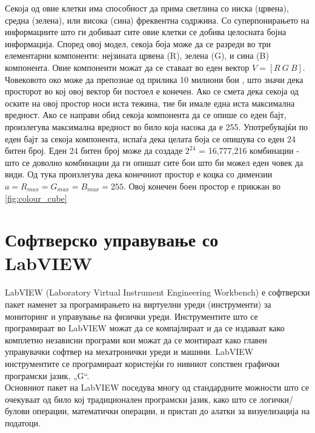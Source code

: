 \documentclass[11pt]{article}
\begin{document}
    Секоја од овие клетки има способност да прима светлина со ниска (црвена), средна (зелена), или висока (сина) фреквентна содржина. Со суперпонирањето на информациите што ги добиваат сите овие клетки се добива целосната бојна информација. Според овој модел, секоја боја може да се разреди во три елементарни компоненти: нејзината црвена (R), зелена (G), и сина (B) компонента. Овие компоненти можат да се ставаат во еден вектор $ V = [R\ G\ B]$. Човековото око може да препознае од прилика 10 милиони бои \cite{nColours}, што значи дека просторот во кој овој вектор би постоел е конечен. Ако се смета дека секоја од оските на овој простор носи иста тежина, тие би имале една иста максимална вредност. Ако се направи обид секоја компонента да се опише со еден бајт, произлегува максимална вредност во било која насока да е 255. Употребувајќи по еден бајт за секоја компонента, испаѓа дека целата боја се опишува со еден 24 битен број. Еден 24 битен број може да создаде $2^{24}$ = 16,777,216 комбинации - што се доволно комбинации да ги опишат сите бои што би можел еден човек да види. Од тука произлегува дека конечниот простор е коцка со димензии $a = R_{max} = G_{max} = B_{max} = 255 $.
    Овој конечен боен простор е прикжан  во \ref{fig:colour_cube}
    \bigbreak

\newpage

\section{Софтверско управување со LabVIEW}
  LabVIEW (Laboratory Virtual Instrument Engineering Workbench) е софтверски пакет наменет за програмирањето на виртуелни уреди (инструменти) за мониторинг и управување на физички уреди. Инструментите што се програмираат во LabVIEW можат да се компајлираат и да се издаваат како комплетно независни програми кои можат да се монтираат како главен управувачки софтвер на мехатронички уреди и машини. LabVIEW инструментите се програмираат користејќи го нивниот сопствен графички програмски јазик, „G“.
  \\
  Основниот пакет на LabVIEW поседува многу од стандардните можности што се очекуваат од било кој традиционален програмски јазик, како што се логички/булови операции, математички операции, и пристап до алатки за визуелизација на податоци.
\end{document}
